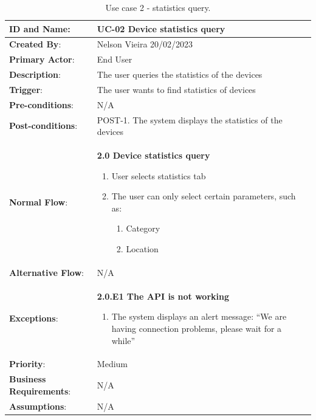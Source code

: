 \begin{table}[H]
    \centering
    \caption{Use case 2 - statistics query.}
    \label{table:use_case2}
    \vspace{1em}
    \begin{adjustbox}{width=1.2\textwidth,center=\textwidth}
        \begin{tabular}{|m{4cm}|m{12cm}|}
            \hline
            \textbf{ID and Name}: & UC-02 Device statistics query \\
            \hline
            \textbf{Created By}: & Nelson Vieira 20/02/2023 \\
            \hline
            \textbf{Primary Actor}: & End User \\
            \hline
            \textbf{Description}: & The user queries the statistics of the devices \\
            \hline
            \textbf{Trigger}: & The user wants to find statistics of devices \\
            \hline
            \textbf{Pre-conditions}: & N/A \\
            \hline
            \textbf{Post-conditions}: & POST-1. The system displays the statistics of the devices \\
            \hline
            \textbf{Normal Flow}: & \textbf{2.0 Device statistics query}
            \begin{enumerate}
                \item User selects statistics tab
                \item The user can only select certain parameters, such as:
                \begin{enumerate}
                    \item Category
                    \item Location
                \end{enumerate}
            \end{enumerate} \\
            \hline
            \textbf{Alternative Flow}: & N/A \\
            \hline
            \textbf{Exceptions}: & \textbf{2.0.E1  The API is not working}
            \begin{enumerate}
                \item The system displays an alert message: ``We are having connection problems, please wait for a while''
            \end{enumerate} \\
            \hline
            \textbf{Priority}: & Medium \\
            \hline
            \textbf{Business Requirements}: & N/A \\
            \hline
            \textbf{Assumptions}: & N/A \\
            \hline
        \end{tabular}
    \end{adjustbox}
\end{table}

